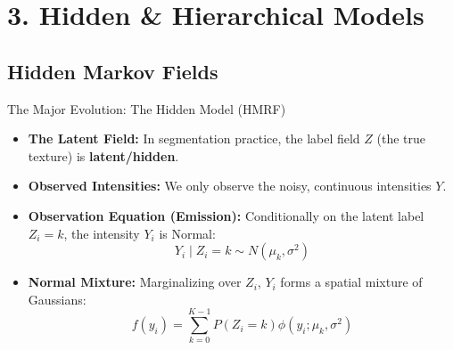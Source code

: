 \documentclass[
  ignorenonframetext,
]{beamer}
\providecommand{\tightlist}{%
  \setlength{\itemsep}{0pt}\setlength{\parskip}{0pt}}\usepackage{longtable,booktabs,array}
\begin{document}
\section{3. Hidden \& Hierarchical
Models}\label{hidden-hierarchical-models}

\subsection{Hidden Markov Fields}\label{hidden-markov-fields}

\begin{frame}{The Major Evolution: The Hidden Model (HMRF)}
\label{the-major-evolution-the-hidden-model-hmrf}
\begin{itemize}
\tightlist
\item
  \textbf{The Latent Field:} In segmentation practice, the label field
  \(Z\) (the true texture) is \textbf{latent/hidden}.
\item
  \textbf{Observed Intensities:} We only observe the noisy, continuous
  intensities \(Y\).
\item
  \textbf{Observation Equation (Emission):} Conditionally on the latent
  label \(Z_i = k\), the intensity \(Y_i\) is Normal:
  \[Y_i \mid Z_i = k \sim N(\mu_k, \sigma^2)\]
\item
  \textbf{Normal Mixture:} Marginalizing over \(Z_i\), \(Y_i\) forms a
  spatial mixture of Gaussians:
  \[f(y_i) = \sum_{k=0}^{K-1} P(Z_i = k) \phi(y_i; \mu_k, \sigma^2)\]
\end{itemize}
\end{frame}
\end{document}

